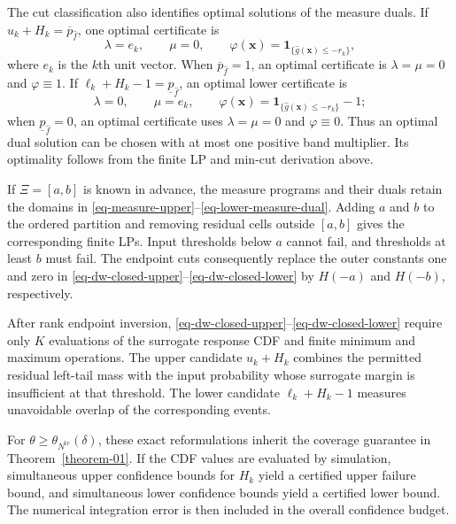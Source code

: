 \documentclass[review,11pt,3p,authoryear,nopreprintline]{elsarticle}
\begin{document}
The cut classification also identifies optimal solutions of the measure duals. If $u_k+H_k=\overline p_{\hat f}$, one optimal certificate is
\[
  \lambda=e_k,\qquad \mu=0,\qquad
  \varphi(\bm x)=\mathbf1_{\{\hat g(\bm x)\le-r_k\}},
\]
where $e_k$ is the $k$th unit vector. When $\overline p_{\hat f}=1$, an optimal certificate is $\lambda=\mu=0$ and $\varphi\equiv1$. If $\ell_k+H_k-1=\underline p_{\hat f}$, an optimal lower certificate is
\[
  \lambda=0,\qquad \mu=e_k,\qquad
  \varphi(\bm x)=\mathbf1_{\{\hat g(\bm x)\le-r_k\}}-1;
\]
when $\underline p_{\hat f}=0$, an optimal certificate uses $\lambda=\mu=0$ and $\varphi\equiv0$. Thus an optimal dual solution can be chosen with at most one positive band multiplier. Its optimality follows from the finite LP and min-cut derivation above.

\begin{remark}
  \label{rem-interval-support}
  If $\Xi=[a,b]$ is known in advance, the measure programs and their duals retain the domains in \eqref{eq-measure-upper}--\eqref{eq-lower-measure-dual}. Adding $a$ and $b$ to the ordered partition and removing residual cells outside $[a,b]$ gives the corresponding finite LPs. Input thresholds below $a$ cannot fail, and thresholds at least $b$ must fail. The endpoint cuts consequently replace the outer constants one and zero in \eqref{eq-dw-closed-upper}--\eqref{eq-dw-closed-lower} by $H(-a)$ and $H(-b)$, respectively.
\end{remark}

After rank endpoint inversion, \eqref{eq-dw-closed-upper}--\eqref{eq-dw-closed-lower} require only $K$ evaluations of the surrogate response CDF and finite minimum and maximum operations. The upper candidate $u_k+H_k$ combines the permitted residual left-tail mass with the input probability whose surrogate margin is insufficient at that threshold. The lower candidate $\ell_k+H_k-1$ measures unavoidable overlap of the corresponding events.

For $\theta\ge\theta_{N^{\mathrm{te}}}(\delta)$, these exact reformulations inherit the coverage guarantee in Theorem~\ref{theorem-01}. If the CDF values are evaluated by simulation, simultaneous upper confidence bounds for $H_k$ yield a certified upper failure bound, and simultaneous lower confidence bounds yield a certified lower bound. The numerical integration error is then included in the overall confidence budget.



\end{document}
